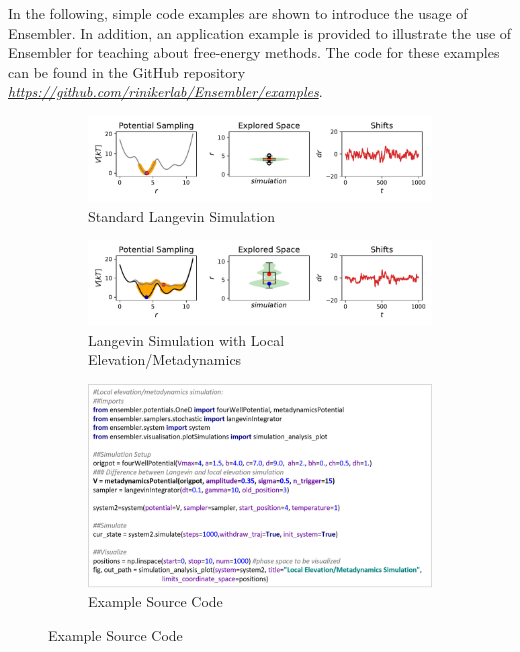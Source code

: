 In the following, simple code examples are shown to introduce the usage of Ensembler. In addition, an application example is provided to illustrate the use of Ensembler for teaching about free-energy methods. 
The code for these examples can be found in the GitHub repository \textit{\hyperlink{https://github.com/rinikerlab/Ensembler}{https://github.com/rinikerlab/Ensembler/examples}}.

\begin{figure}[H]
	\centering
	\begin{subfigure}{\textwidth}
		\caption{Standard Langevin Simulation}
		\centering
		\includegraphics[width=0.85\linewidth]{fig/codeExamples/langevin_simulation.pdf} 
	\end{subfigure}
	\vspace{2.5mm}
	\begin{subfigure}{\textwidth}
		\caption{Langevin Simulation with Local Elevation/Metadynamics}
		\centering
		\includegraphics[width=0.85\linewidth]{fig/codeExamples/metaDynamics_simulation.pdf}
	\end{subfigure}
	\vspace{2.5mm}
	\begin{subfigure}{\textwidth}
		\caption{Example Source Code}
		\centering
		\includegraphics[width=0.85\linewidth]{fig/codeExamples/Simulation_code.png}

\end{subfigure}
\end{figure}
